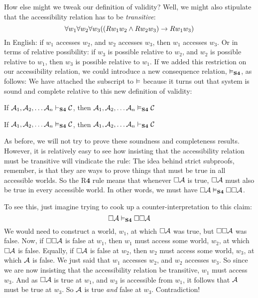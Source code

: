 How else might we tweak our definition of validity? Well, we might also stipulate that the accessibility relation has to be \emph{transitive}:
\[\forall w_1\forall w_2\forall w_3 ((Rw_1w_2 \wedge Rw_2w_3)\rightarrow Rw_1w_3)\]
In English: if $w_1$ accesses $w_2$, and $w_2$ accesses $w_3$, then $w_1$ accesses $w_3$. Or in terms of relative possibility: if $w_3$ is possible relative to $w_2$, and $w_2$ is possible relative to $w_1$, then $w_3$ is possible relative to $w_1$. If we added this restriction on our accessibility relation, we could introduce a new consequence relation, $\vDash_{\mathbf{S4}}$, as follows:
We have attached the \mlSfour{} subscript to $\vDash$ because it turns out that system \mlSfour{} is sound and complete relative to this new definition of validity:
\begin{compactlist}
	\item If $\mathcal{A}_1,\mathcal{A}_2, \dots \mathcal{A}_n\vdash_{\mathbf{S4}}\mathcal{C}$, then $\mathcal{A}_1,\mathcal{A}_2, \dots \mathcal{A}_n\vDash_{\mathbf{S4}}\mathcal{C}$
	\item If $\mathcal{A}_1,\mathcal{A}_2, \dots \mathcal{A}_n\vDash_{\mathbf{S4}}\mathcal{C}$, then $\mathcal{A}_1,\mathcal{A}_2, \dots \mathcal{A}_n\vdash_{\mathbf{S4}}\mathcal{C}$
\end{compactlist}
As before, we will not try to prove these soundness and completeness results. However, it is relatively easy to see how insisting that the accessibility relation must be transitive will vindicate the \mlSfour{} rule:
The idea behind strict subproofs, remember, is that they are ways to prove things that must be true in all accessible worlds. So the R$\mathbf{4}$ rule means that whenever $\Box \mathcal{A}$ is true, $\Box \mathcal{A}$ must also be true in every accessible world. In other words, we must have $\Box\mathcal{A} \vDash_{\mathbf{S4}} \Box\Box\mathcal{A}$.

To see this, just imagine trying to cook up a counter-interpretation to this claim:
\[\Box\mathcal{A} \vDash_{\mathbf{S4}} \Box \Box \mathcal{A}\]
We would need to construct a world, $w_1$, at which $\Box\mathcal{A}$ was true, but $\Box \Box \mathcal{A}$ was false. Now, if $\Box \Box \mathcal{A}$ is false at $w_1$, then $w_1$ must access some world, $w_2$, at which $\Box\mathcal{A}$ is false. Equally, if $\Box \mathcal{A}$ is false at $w_2$, then $w_2$ must access some world, $w_3$, at which $\mathcal{A}$ is false. We just said that $w_1$ accesses $w_2$, and $w_2$ accesses $w_3$. So since we are now insisting that the accessibility relation be transitive, $w_1$ must access $w_3$. And as $\Box\mathcal{A}$ is true at $w_1$, and $w_3$ is accessible from $w_1$, it follows that $\mathcal{A}$ must be true at $w_3$. So $\mathcal{A}$ is true \emph{and} false at $w_3$. Contradiction!

